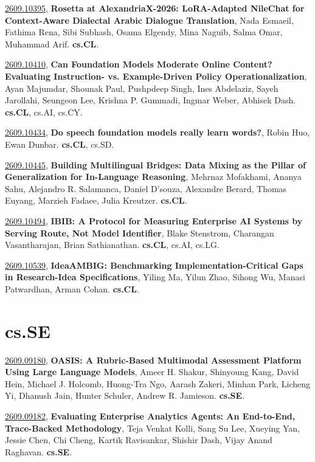 \documentclass[9pt, a4paper]{article}
\theoremstyle{plain}
\theoremstyle{definition}
\theoremstyle{remark}
\newcommand{\arxivwithtarget}[3]{\hypertarget{#1}{}\href{https://arxiv.org/abs/#1}{#1}, \textbf{\textcolor{arxivblue}{#2}}, #3. }
\begin{document}
\arxivwithtarget{2609.10395}{Rosetta at AlexandriaX-2026: LoRA-Adapted NileChat for Context-Aware Dialectal Arabic Dialogue Translation}{Nada Esmaeil, Fathima Rena, Sibi Subhash, Osama Elgendy, Mina Naguib, Salma Omar, Muhammad Arif}\textbf{cs.CL}.



\arxivwithtarget{2609.10410}{Can Foundation Models Moderate Online Content? Evaluating Instruction- vs. Example-Driven Policy Operationalization}{Ayan Majumdar, Shounak Paul, Pushpdeep Singh, Ines Abdelaziz, Sayeh Jarollahi, Seungeon Lee, Krishna P. Gummadi, Ingmar Weber, Abhisek Dash}\textbf{cs.CL}, cs.AI, cs.CY.



\arxivwithtarget{2609.10434}{Do speech foundation models really learn words?}{Robin Huo, Ewan Dunbar}\textbf{cs.CL}, cs.SD.



\arxivwithtarget{2609.10445}{Building Multilingual Bridges: Data Mixing as the Pillar of Generalization for In-Language Reasoning}{Mehrnaz Mofakhami, Ananya Sahu, Alejandro R. Salamanca, Daniel D'souza, Alexandre Berard, Thomas Euyang, Marzieh Fadaee, Julia Kreutzer}\textbf{cs.CL}.



\arxivwithtarget{2609.10494}{IBIB: A Protocol for Measuring Enterprise AI Systems by Serving Route, Not Model Identifier}{Blake Stenstrom, Charangan Vasantharajan, Brian Sathianathan}\textbf{cs.CL}, cs.AI, cs.LG.



\arxivwithtarget{2609.10539}{IdeaAMBIG: Benchmarking Implementation-Critical Gaps in Research-Idea Specifications}{Yiling Ma, Yilun Zhao, Sihong Wu, Manasi Patwardhan, Arman Cohan}\textbf{cs.CL}.



\section{cs.SE}
\arxivwithtarget{2609.09180}{OASIS: A Rubric-Based Multimodal Assessment Platform Using Large Language Models}{Ameer H. Shakur, Shinyoung Kang, David Hein, Michael J. Holcomb, Huong-Tra Ngo, Aarash Zakeri, Minhan Park, Licheng Yi, Dhanush Jain, Hunter Schuler, Andrew R. Jamieson}\textbf{cs.SE}.



\arxivwithtarget{2609.09182}{Evaluating Enterprise Analytics Agents: An End-to-End, Trace-Backed Methodology}{Teja Venkat Kolli, Sang Su Lee, Xueying Yan, Jessie Chen, Chi Cheng, Kartik Ravisankar, Shishir Dash, Vijay Anand Raghavan}\textbf{cs.SE}.
\end{document}
